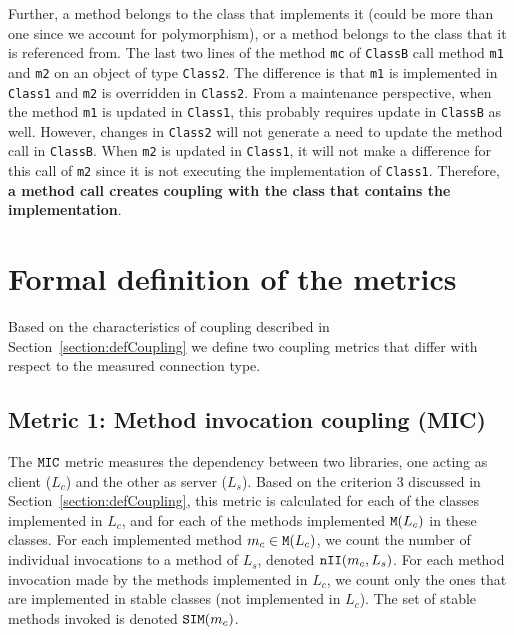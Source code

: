 \documentclass[a4paper]{article}
\begin{document}
Further, a method belongs to the class that implements it (could be more than one since we account for polymorphism), or a method belongs to the class that it is referenced from. %
The last two lines of the method \texttt{mc} of \texttt{ClassB} call method \texttt{m1} and \texttt{m2} on an object of type \texttt{Class2}. The difference is that \texttt{m1} is implemented in \texttt{Class1} and \texttt{m2} is overridden in \texttt{Class2}. From a maintenance perspective, when the method \texttt{m1} is updated in \texttt{Class1}, this probably requires update in \texttt{ClassB} as well. However, changes in \texttt{Class2} will not generate a need to update the method call in \texttt{ClassB}. When  \texttt{m2} is updated in \texttt{Class1}, it will not make a difference for this call of \texttt{m2} since it is not executing the implementation of \texttt{Class1}. Therefore, \textbf{a method call creates coupling with the class that contains the implementation}.

\section{Formal definition of the metrics}\label{section:metrics}
Based on the characteristics of coupling described in %
Section~\ref{section:defCoupling} we define two coupling metrics that differ with respect to the measured connection type. %

\subsection{Metric 1: Method invocation coupling (MIC)}
The $\verb|MIC|$ metric measures the dependency between two libraries, one acting as client ($L_c$) and the other as server ($L_s$).%
Based on the criterion 3 discussed in Section~\ref{section:defCoupling}, this metric is calculated for each of the classes implemented in $L_c$, and for each of the methods implemented $\verb|M|(L_c)$ in these classes. For each implemented method  $m_c \in \verb|M|(L_c)$, we count the number of individual invocations to a method of $L_s$, denoted $\verb|nII|(m_c,L_s)$. For each method invocation made by the methods implemented in $L_c$, we count only the ones that are implemented in stable classes (not implemented in $L_c$). The set of stable methods invoked is denoted $\verb|SIM|(m_c)$.
\end{document}
